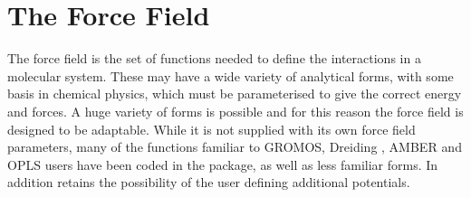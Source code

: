 
\section{The \D{} Force Field}
\label{fieldintro}

The force field is the set of functions needed to define the
interactions in a molecular system. These may have a wide variety of
analytical forms, with some basis in chemical physics, which must be
parameterised to give the correct energy and forces. A huge variety of
forms is possible and for this reason the \D{} force field is designed
to be adaptable. While it is not supplied with its own force field
parameters, many of the functions familiar to
GROMOS,
\cite{gunsteren-87a} Dreiding \cite{mayo-90a}, AMBER \cite{weiner-86a} and
OPLS \cite{jorgensen-84a}
users have been 
coded in the package, as well as less familiar forms. In addition
\D{} retains the possibility of the user defining additional
potentials.

